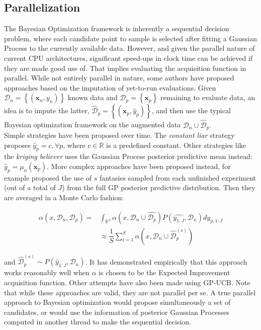 \documentclass[10pt,a4paper,twoside]{book}
\begin{document}
\subsection{Parallelization}

The Bayesian Optimization framework is inherently a sequential decision problem, where each candidate point to sample is selected after fitting a Gaussian Process to the currently available data. However, and given the parallel nature of current CPU architectures, significant speed-ups in clock time can be achieved if they are made good use of. That implies evaluating the acquisition function in parallel. While not entirely parallel in nature, some authors have proposed approaches based on the imputation of yet-to-run evaluations. Given $\mathcal{D}_n = \left\lbrace (\boldsymbol{x}_n, y_n) \right\rbrace$ known data and $\mathcal{D}_p = \left\lbrace \boldsymbol{x}_p \right\rbrace$ remaining to evaluate data, an idea is to impute the latter, $\hat{\mathcal{D}}_p = \left\lbrace (\boldsymbol{x}_p, \hat{y}_p) \right\rbrace$, and then use the typical Bayesian optimization framework on the augmented data $\mathcal{D}_n \cup \hat{\mathcal{D}}_p$.\\

Simple strategies have been proposed over time. The \textit{constant liar} strategy proposes $\hat{y}_p = c, \forall p$, where $c \in \mathbb{R}$ is a predefined constant. Other strategies like the \textit{kriging believer} uses the Gaussian Process posterior predictive mean instead: $\hat{y}_p = \mu_n(\boldsymbol{x}_p)$. More complex approaches have been proposed instead, for example \cite{Snoek2012} proposed the use of $s$ fantasies sampled from each unfinished experiment (out of a total of $J$) from the full GP posterior predictive distribution. Then they are averaged in a Monte Carlo fashion:

\begin{align}
\alpha(x, \mathcal{D}_n, \mathcal{D}_p) =& \int_{\mathbb{R}^J} \alpha(x, \mathcal{D}_n \cup \hat{\mathcal{D}_p})P(\hat{y_{1:J}}, \mathcal{D}_n) dy_{p, 1:J}\\
&\approx \dfrac{1}{S} \sum_{i=1}^S \alpha(x, \mathcal{D}_n \cup \hat{\mathcal{D}}_p^{(s)})
\end{align} 

and $\hat{\mathcal{D}}_p^{(s)} \sim P(\hat{y}_{1:J}, \mathcal{D}_n)$. It has demonstrated empirically that this approach works reasonably well when $\alpha$ is chosen to be the Expected Improvement acquisition function. Other attempts \cite{Desautels2012} have also been made using GP-UCB. Note that while these approaches are valid, they are not parallel per se. A true parallel approach to Bayesian optimization would propose simultaneously a set of candidates, or would use the information of posterior Gaussian Processes computed in another thread to make the sequential decision. 
\end{document}
